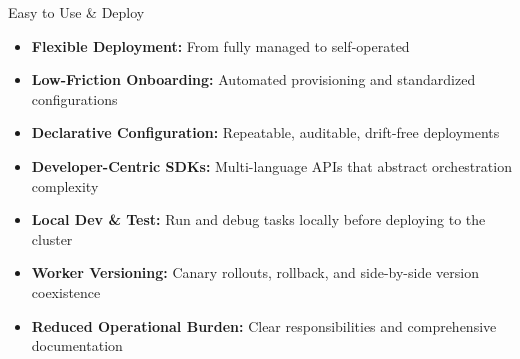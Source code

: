 
\begin{frame}{Easy to Use \& Deploy}
	\begin{itemize}
		\item \textbf{Flexible Deployment:} From fully managed to self-operated
		\item \textbf{Low-Friction Onboarding:} Automated provisioning and standardized configurations
		\item \textbf{Declarative Configuration:} Repeatable, auditable, drift-free deployments
		\item \textbf{Developer-Centric SDKs:} Multi-language APIs that abstract orchestration complexity
		\item \textbf{Local Dev \& Test:} Run and debug tasks locally before deploying to the cluster
		\item \textbf{Worker Versioning:} Canary rollouts, rollback, and side-by-side version coexistence
		\item \textbf{Reduced Operational Burden:} Clear responsibilities and comprehensive documentation
	\end{itemize}
\end{frame}

